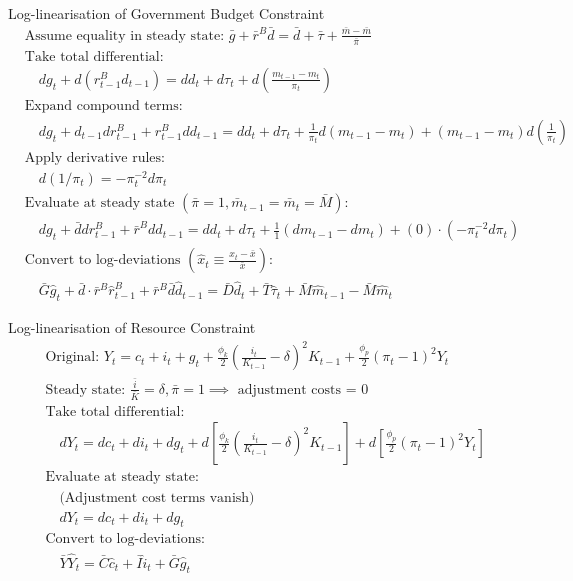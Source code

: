 \documentclass[11pt,preprint]{elsarticle}
\numberwithin{equation}{section}
\numberwithin{figure}{section}
\numberwithin{table}{section}
\begin{document}
Log-linearisation of Government Budget Constraint \begin{align*}
& \text{Assume equality in steady state: } \bar{g} + \bar{r}^B \bar{d} = \bar{d} + \bar{\tau} + \frac{\bar{m} - \bar{m}}{\bar{\pi}} \\[6pt]
& \text{Take total differential:} \\
& \quad dg_t + d(r^B_{t-1} d_{t-1}) = dd_t + d\tau_t + d\left( \frac{m_{t-1} - m_t}{\pi_t} \right) \\[6pt]
& \text{Expand compound terms:} \\
& \quad dg_t + d_{t-1} dr^B_{t-1} + r^B_{t-1} dd_{t-1} = dd_t + d\tau_t + \frac{1}{\pi_t} d(m_{t-1} - m_t) + (m_{t-1} - m_t) d\left(\frac{1}{\pi_t}\right) \\[6pt]
& \text{Apply derivative rules:} \\
& \quad d(1/\pi_t) = -\pi_t^{-2} d\pi_t \\[6pt]
& \text{Evaluate at steady state } (\bar{\pi} = 1, \bar{m}_{t-1} = \bar{m}_t = \bar{M}): \\
& \quad dg_t + \bar{d} dr^B_{t-1} + \bar{r}^B dd_{t-1} = dd_t + d\tau_t + \frac{1}{1} (dm_{t-1} - dm_t) + (0) \cdot (-\pi_t^{-2} d\pi_t) \\[6pt]
& \text{Convert to log-deviations } (\hat{x}_t \equiv \frac{x_t - \bar{x}}{\bar{x}}): \\
& \quad \bar{G} \hat{g}_t + \bar{d} \cdot \bar{r}^B \hat{r}^B_{t-1} + \bar{r}^B \bar{d} \hat{d}_{t-1} = \bar{D} \hat{d}_t + \bar{T} \hat{\tau}_t + \bar{M} \hat{m}_{t-1} - \bar{M} \hat{m}_t
\end{align*}

Log-linearisation of Resource Constraint \begin{align*}
& \text{Original: } Y_t = c_t + i_t + g_t + \frac{\phi_k}{2} \left( \frac{i_t}{K_{t-1}} - \delta \right)^2 K_{t-1} + \frac{\phi_p}{2} (\pi_t - 1)^2 Y_t \\[6pt]
& \text{Steady state: } \frac{\bar{i}}{\bar{K}} = \delta, \bar{\pi} = 1 \implies \text{ adjustment costs = 0} \\[6pt]
& \text{Take total differential:} \\
& \quad dY_t = dc_t + di_t + dg_t + d\left[ \frac{\phi_k}{2} \left( \frac{i_t}{K_{t-1}} - \delta \right)^2 K_{t-1} \right] + d\left[ \frac{\phi_p}{2} (\pi_t - 1)^2 Y_t \right] \\[6pt]
& \text{Evaluate at steady state:} \\
& \quad \text{(Adjustment cost terms vanish)} \\
& \quad dY_t = dc_t + di_t + dg_t \\[6pt]
& \text{Convert to log-deviations:} \\
& \quad \bar{Y} \hat{Y}_t = \bar{C} \hat{c}_t + \bar{I} \hat{i}_t + \bar{G} \hat{g}_t
\end{align*}
\end{document}
